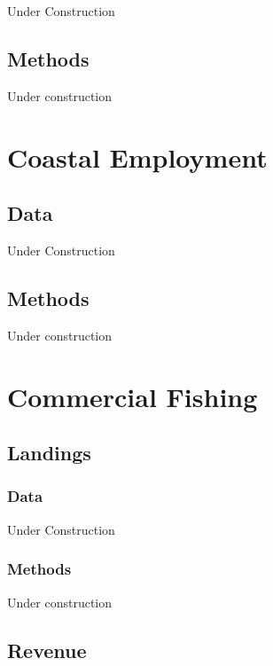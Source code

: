 \documentclass[
]{book}
\begin{document}
Under Construction

\hypertarget{methods-13}{%
\section{Methods}\label{methods-13}}

Under construction

\hypertarget{coastal-employment}{%
\chapter{Coastal Employment}\label{coastal-employment}}

\hypertarget{data-14}{%
\section{Data}\label{data-14}}

Under Construction

\hypertarget{methods-14}{%
\section{Methods}\label{methods-14}}

Under construction

\hypertarget{commercial-fishing}{%
\chapter{Commercial Fishing}\label{commercial-fishing}}

\hypertarget{landings}{%
\section{Landings}\label{landings}}

\hypertarget{data-15}{%
\subsection{Data}\label{data-15}}

Under Construction

\hypertarget{methods-15}{%
\subsection{Methods}\label{methods-15}}

Under construction

\hypertarget{revenue}{%
\section{Revenue}\label{revenue}}
\end{document}
